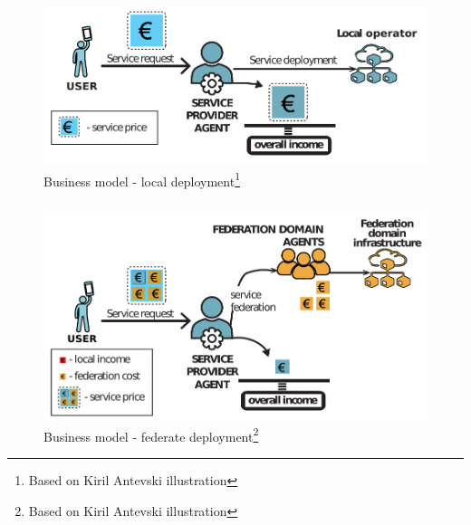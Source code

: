 \documentclass[aspectratio=169]{beamer}
\begin{document}
\begin{frame}
    \frametitle{\secname}
    \framesubtitle{\subsecname}

    \begin{figure}
        \centering
        \includegraphics[width=.8\textwidth]{img/local-deploy.pdf}
        \caption{Business model - local deployment\footnote{Based on Kiril Antevski illustration}}
        \label{fig:local-deploy}
    \end{figure}
\end{frame}



\begin{frame}
    \frametitle{\secname}
    \framesubtitle{\subsecname}

    \begin{figure}
        \centering
        \includegraphics[width=.7\textwidth]{img/federation-deploy.pdf}
        \caption{Business model - federate deployment\footnote{Based on Kiril Antevski illustration}}
        \label{fig:local-deploy}
    \end{figure}
\end{frame}
\end{document}
